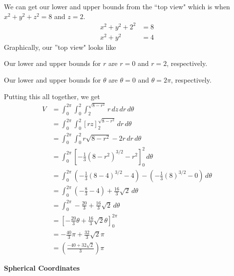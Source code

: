 \documentclass{article}
\newcommand{\lrp}[1]{\left( #1 \right)}
\newcommand{\lrb}[1]{\left[ #1 \right]}
\begin{document}
We can get our lower and upper bounds from the ``top view" which is when $x^2+y^2+z^2=8$ and $z=2$. 
\begin{align*}
    x^2+y^2+2^2&=8\\
    x^2+y^2&=4
\end{align*}
Graphically, our ''top view" looks like
\begin{center}
\end{center}

Our lower and upper bounds for $r$ are $r=0$ and $r=2$, respectively.

Our lower and upper bounds for $\theta$ are $\theta=0$ and $\theta=2\pi$, respectively.

Putting this all together, we get
\begin{align*}
    V&=\int_0^{2\pi}\int_0^{2}\int_2^{\sqrt{8-r^2}}r\,dz\,dr\,d\theta\\
    &=\int_0^{2\pi}\int_0^{2}\lrb{rz}_2^{\sqrt{8-r^2}}\,dr\,d\theta\\
    &=\int_0^{2\pi}\int_0^{2} r\sqrt{8-r^2}-2r\,dr\,d\theta\\
    &=\int_0^{2\pi}\lrb{-\frac{1}{3}(8-r^2)^{3/2}-r^2}_0^2\,d\theta\\
    &=\int_0^{2\pi}\lrp{-\frac{1}{3}\lrp{8-4}^{3/2}-4}-\lrp{-\frac{1}{3}(8)^{3/2}-0}\,d\theta\\
    &=\int_0^{2\pi}\lrp{-\frac{8}{3}-4}+\frac{16}{3}\sqrt{2}\,d\theta\\
    &=\int_0^{2\pi}-\frac{20}{3}+\frac{16}{3}\sqrt{2}\,d\theta\\
    &=\lrb{-\frac{20}{3}\theta+\frac{16}{3}\sqrt{2}\theta}_0^{2\pi}\\
    &=-\frac{40}{3}\pi+\frac{32}{3}\sqrt{2}\pi\\
    &=\boxed{\lrp{\frac{-40+32\sqrt{2}}{3}}\pi}
\end{align*}
{}\textbf{Spherical Coordinates}
\end{document}
